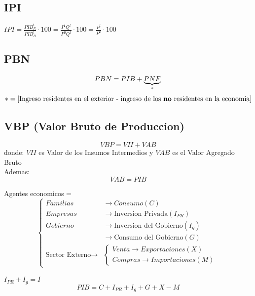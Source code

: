 \documentclass{report}
\begin{document}
\subsection{IPI}

$IPI = \frac{PIB_N^t}{PIB_R^t}\cdot 100 = \frac{P^tQ^t}{P^0Q^t} \cdot 100 = \frac{P^t}{P^0} \cdot 100$

\subsection{PBN}

\[
	PBN = PIB + \underbrace{PNF}_{*} \\
\]
\[
	* = [\text{Ingreso residentes en el exterior - ingreso de los \textbf{no} residentes en la economia}]
\]


\subsection{VBP (Valor Bruto de Produccion)}
\[
	VBP = VII + VAB
\]
donde: $VII$ es Valor de los Insumos Intermedios y $VAB$ es el Valor Agregado Bruto \\
Ademas: \[
	VAB = PIB
\]

Agentes economicos =
\[
	\left\{\begin{array}{ll}
		Familias                          & \rightarrow Consumo (C)                         \\
		Empresas                          & \rightarrow \text{Inversion Privada} (I_{PR})   \\
		Gobierno                          & \rightarrow \text{Inversion del Gobierno} (I_g) \\
		                                  & \rightarrow \text{Consumo del Gobierno} (G)     \\
		\text{Sector Externo} \rightarrow &
		\left\{ \begin{array}{l}
			        Venta \rightarrow Exportaciones (X) \\
			        Compras \rightarrow Importaciones (M)
		        \end{array}\right.
	\end{array}\right.
\]

\( I_{PR}+I_g = I \) \\
\[
	PIB = C + I_{PR} + I_g + G + X - M
\]
\end{document}

